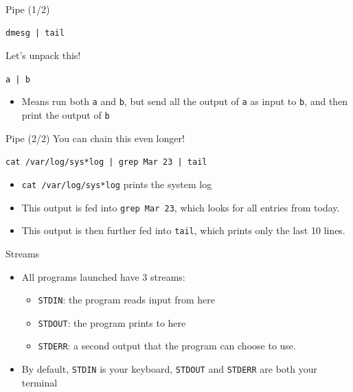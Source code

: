 \documentclass[12pt]{beamer}
\begin{document}
\begin{frame}[fragile]{Pipe (1/2)}
  \begin{verbatim}
dmesg | tail
  \end{verbatim}
  Let's unpack this!

  \texttt{a | b}
  \begin{itemize}
    \item Means run both \texttt{a} and \texttt{b}, but send all the output of \texttt{a} as input to \texttt{b}, and then print the output of \texttt{b}
  \end{itemize}
\end{frame}

\begin{frame}[fragile]{Pipe (2/2)}
  You can chain this even longer!

  \texttt{cat /var/log/sys*log | grep Mar 23 | tail}
  \begin{itemize}
    \item \texttt{cat /var/log/sys*log} prints the system log
    \item This output is fed into \texttt{grep Mar 23}, which looks for all entries from today.
    \item This output is then further fed into \texttt{tail}, which prints only the last 10 lines.
  \end{itemize}
\end{frame}

\begin{frame}[fragile]{Streams}
  \begin{itemize}
    \item All programs launched have 3 streams:
          \begin{itemize}
            \item \texttt{STDIN}: the program reads input from here
            \item \texttt{STDOUT}: the program prints to here
            \item \texttt{STDERR}: a second output that the program can choose to use.
          \end{itemize}
    \item By default, \texttt{STDIN} is your keyboard, \texttt{STDOUT} and \texttt{STDERR} are both your terminal
  \end{itemize}
\end{frame}
\end{document}
